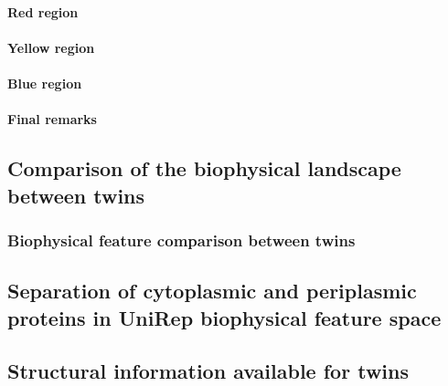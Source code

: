 \documentclass[a4paper]{article}
\begin{document}
			\paragraph{Red region}
				
			\paragraph{Yellow region}
				
			\paragraph{Blue region}
				
			\paragraph{Final remarks}
				
				
	\subsection{Comparison of the biophysical landscape between twins}
		
		
		\subsubsection{Biophysical feature comparison between twins}
			
	\subsection{Separation of cytoplasmic and periplasmic proteins in UniRep biophysical feature space}
		
	\subsection{Structural information available for twins}
	
\newpage
\end{document}

